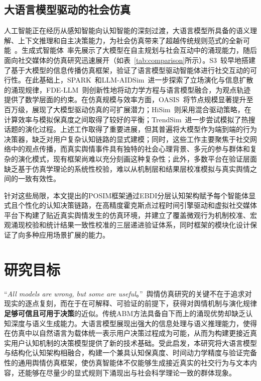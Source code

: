 \documentclass[a4paper,fleqn]{cas-sc}
\begin{document}
\subsection{大语言模型驱动的社会仿真}

人工智能正在经历从感知智能向认知智能的深刻过渡，大语言模型所具备的语义理解、上下文推理和自主决策能力，为社会仿真带来了超越传统规则范式的全新可能~\citep{wang_survey_2024}。生成式智能体~\citep{park_generative_2023}率先展示了大模型在自主规划与社会互动中的涌现能力，随后面向社交媒体的仿真研究迅速展开（如表~\ref{tab:comparison}所示）。S3~\citep{gao_s3_2023}较早地搭建了基于大模型的信息传播仿真框架，验证了语言模型驱动智能体进行社交互动的可行性。在此基础上，SPARK~\citep{zhang_spark_2025}和LLM-AIDSim~\citep{zhang_llm-aidsim_2025,hu_llm-enhanced_2024}进一步探索了立场演化与信息扩散的涌现规律，FDE-LLM~\citep{yao_social_2025}则创新性地将动力学方程与语言模型融合，为观点轨迹提供了数学层面的约束。在仿真规模与效率方面，OASIS~\citep{yang_oasis_2025}将节点规模显著提升至百万级，展现了大模型驱动仿真的可扩展潜力；HiSim~\citep{mou_unveiling_2024}则采用混合驱动策略，在计算效率与模拟保真度之间取得了较好的平衡；TrendSim~\citep{zhang_trendsim_2025}进一步尝试模拟了热搜话题的演化过程。上述工作取得了重要进展，但其普遍将大模型作为端到端的行为决策器，缺乏对用户复杂认知链路的显式建模；同时，这些工作主要聚焦于社交网络中的观点传播，而真实舆情事件具有独特的社会心理背景、多元的参与群体和复杂的演化模式，现有框架尚难以充分刻画这种复杂性；此外，多数平台在验证层面缺乏基于仿真学理论的系统性校验，难以从机制层和结果层校准模拟与真实舆情之间的一致有效性。

针对这些局限，本文提出的POSIM框架通过EBDI分层认知架构赋予每个智能体显式且个性化的认知决策链路，在高精度霍克斯点过程时间引擎驱动和虚拟社交媒体平台下构建了贴近真实舆情发生的仿真环境，并建立了覆盖微观行为机制校准、宏观涌现校验和统计结果一致性校准的三层递进验证体系，同时框架的模块化设计保证了向多种应用场景扩展的能力。

\section{研究目标}\label{sec:objective}

“\textit{All models are wrong, but some are useful}。”~\citep{box_draper_1987_emprical_modelbuilding}舆情仿真研究的关键不在于追求对现实的逐点复刻，而在于在可解释、可验证的前提下，获得对舆情机制与演化规律\textbf{足够可信且可用于决策}的近似。传统ABM方法具备自下而上的涌现优势却缺乏认知深度与语义生成能力。大语言模型展现出强大的信息处理与语义推理能力，使得在仿真中以自然语言为载体统一表示用户决策过程成为可能，从而为构建更接近真实用户认知机制的决策模型提供了新的技术基础。受此启发，本研究将大语言模型与结构化认知架构相融合，构建一个兼具认知保真度、时间动力学精度与验证完备性的通用舆情仿真框架，使仿真智能体不仅能够生成接近真实的社交行为与文本内容，还能够在尽量少的显式规则下涌现出与社会科学理论一致的群体现象。
\end{document}
